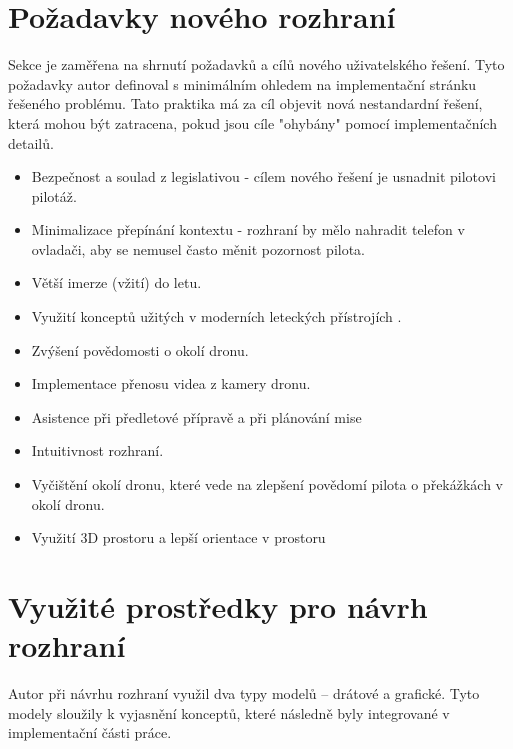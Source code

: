 \section{Požadavky nového rozhraní}
Sekce je zaměřena na shrnutí požadavků a cílů  nového uživatelského řešení. Tyto požadavky autor definoval s minimálním ohledem na implementační stránku řešeného problému. Tato praktika  má za cíl objevit nová nestandardní řešení, která mohou být zatracena, pokud jsou cíle "ohybány" pomocí implementačních detailů. 

\begin{itemize}
    \item Bezpečnost a soulad z legislativou - cílem nového řešení je usnadnit pilotovi pilotáž.
    
    \item Minimalizace přepínání kontextu - rozhraní by mělo nahradit telefon v ovladači, aby se nemusel často měnit pozornost pilota.

    \item Větší imerze (vžití) do letu.
    
    \item Využití konceptů užitých v moderních leteckých přístrojích .
    
    \item Zvýšení povědomosti o okolí dronu.
    
    \item Implementace přenosu videa z kamery dronu.
    
    \item Asistence při předletové přípravě a při plánování mise 
    
    \item Intuitivnost rozhraní.

    \item Vyčištění okolí dronu, které vede na zlepšení povědomí pilota o překážkách v okolí dronu.
    
    \item Využití 3D prostoru a lepší orientace v prostoru
    
\end{itemize}

\section{Využité prostředky pro návrh rozhraní}
Autor při návrhu rozhraní využil dva typy modelů -- drátové a grafické. Tyto modely sloužily k vyjasnění konceptů, které následně byly integrované v implementační části práce.
